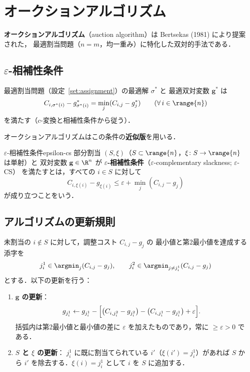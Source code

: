 \section{オークションアルゴリズム}
\label{sec:auction}

\textbf{オークションアルゴリズム}（auction algorithm）は
Bertsekas (1981) により提案された，
最適割当問題（$n = m$，均一重み）に特化した双対的手法である．

\subsection{$\varepsilon$-相補性条件}

最適割当問題（設定~\ref{set:assignment}）の最適解 $\sigma^*$ と
最適双対変数 $\mathbf{g}^*$ は
\[
  C_{i, \sigma^*(i)} - g^*_{\sigma^*(i)} = \min_{j} (C_{i,j} - g^*_j)
  \qquad (\forall\, i \in \range{n})
\]
を満たす（$c$-変換と相補性条件から従う）．

オークションアルゴリズムはこの条件の\textbf{近似版}を用いる．

\begin{definition}{$\varepsilon$-相補性条件}{epsilon-cs}
  部分割当 $(S, \xi)$（$S \subset \range{n}$，$\xi \colon S \to \range{n}$ は単射）と
  双対変数 $\mathbf{g} \in \R^n$ が
  \textbf{$\varepsilon$-相補性条件}（$\varepsilon$-complementary slackness; $\varepsilon$-CS）
  を満たすとは，すべての $i \in S$ に対して
  \[
    C_{i, \xi(i)} - g_{\xi(i)} \leq \varepsilon + \min_{j} (C_{i,j} - g_j)
  \]
  が成り立つことをいう．
\end{definition}

\subsection{アルゴリズムの更新規則}

未割当の $i \notin S$ に対して，調整コスト $C_{i,j} - g_j$ の
最小値と第2最小値を達成する添字を
\[
  j_i^1 \in \argmin_{j} (C_{i,j} - g_j), \qquad
  j_i^2 \in \argmin_{j \neq j_i^1} (C_{i,j} - g_j)
\]
とする．以下の更新を行う：

\begin{enumerate}
  \item \textbf{$\mathbf{g}$ の更新}：
    \[
      g_{j_i^1} \leftarrow g_{j_i^1}
      - \Bigl[\bigl(C_{i, j_i^2} - g_{j_i^2}\bigr) - \bigl(C_{i, j_i^1} - g_{j_i^1}\bigr) + \varepsilon\Bigr].
    \]
    括弧内は第2最小値と最小値の差に $\varepsilon$ を加えたものであり，常に $\geq \varepsilon > 0$ である．
  \item \textbf{$S$ と $\xi$ の更新}：
    $j_i^1$ に既に割当てられている $i'$（$\xi(i') = j_i^1$）があれば
    $S$ から $i'$ を除去する．$\xi(i) = j_i^1$ として $i$ を $S$ に追加する．
\end{enumerate}

